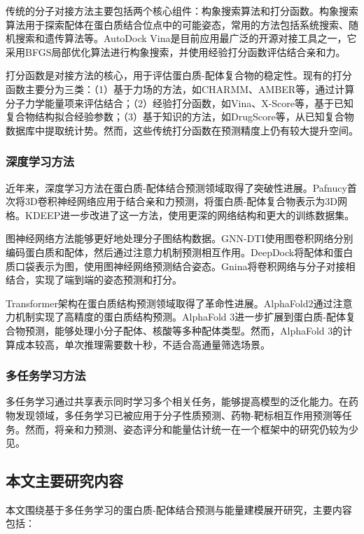 传统的分子对接方法主要包括两个核心组件：构象搜索算法和打分函数。构象搜索算法用于探索配体在蛋白质结合位点中的可能姿态，常用的方法包括系统搜索、随机搜索和遗传算法等。AutoDock Vina是目前应用最广泛的开源对接工具之一，它采用BFGS局部优化算法进行构象搜索，并使用经验打分函数评估结合亲和力。

打分函数是对接方法的核心，用于评估蛋白质-配体复合物的稳定性。现有的打分函数主要分为三类：（1）基于力场的方法，如CHARMM、AMBER等，通过计算分子力学能量项来评估结合；（2）经验打分函数，如Vina、X-Score等，基于已知复合物结构拟合经验参数；（3）基于知识的方法，如DrugScore等，从已知复合物数据库中提取统计势。然而，这些传统打分函数在预测精度上仍有较大提升空间。

\subsubsection{深度学习方法}

近年来，深度学习方法在蛋白质-配体结合预测领域取得了突破性进展。Pafnucy首次将3D卷积神经网络应用于结合亲和力预测，将蛋白质-配体复合物表示为3D网格。KDEEP进一步改进了这一方法，使用更深的网络结构和更大的训练数据集。

图神经网络方法能够更好地处理分子图结构数据。GNN-DTI使用图卷积网络分别编码蛋白质和配体，然后通过注意力机制预测相互作用。DeepDock将配体和蛋白质口袋表示为图，使用图神经网络预测结合姿态。Gnina将卷积网络与分子对接相结合，实现了端到端的姿态预测和打分。

Transformer架构在蛋白质结构预测领域取得了革命性进展。AlphaFold2通过注意力机制实现了高精度的蛋白质结构预测。AlphaFold 3进一步扩展到蛋白质-配体复合物预测，能够处理小分子配体、核酸等多种配体类型。然而，AlphaFold 3的计算成本较高，单次推理需要数十秒，不适合高通量筛选场景。

\subsubsection{多任务学习方法}

多任务学习通过共享表示同时学习多个相关任务，能够提高模型的泛化能力。在药物发现领域，多任务学习已被应用于分子性质预测、药物-靶标相互作用预测等任务。然而，将亲和力预测、姿态评分和能量估计统一在一个框架中的研究仍较为少见。

\subsection{本文主要研究内容}

本文围绕基于多任务学习的蛋白质-配体结合预测与能量建模展开研究，主要内容包括：

